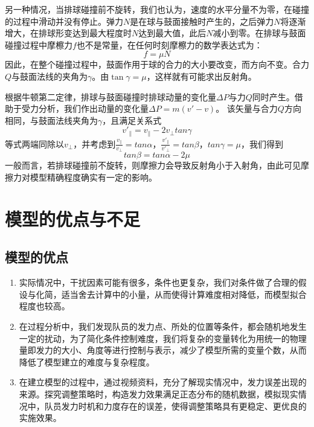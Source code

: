 \documentclass[withoutpreface,bwprint]{cumcmthesis} %
\begin{document}
另一种情况，当排球碰撞前不旋转，我们也认为，速度的水平分量不为零，在碰撞的过程中滑动并没有停止。弹力$N$是在球与鼓面接触时产生的，之后弹力$N$将逐渐增大，在排球形变达到最大程度时$N$达到最大值，此后$N$减小到零。在排球与鼓面碰撞过程中摩檫力$f$也不是常量，在任何时刻摩檫力的数学表达式为：
\begin{equation}
	f=\mu N
\end{equation}
因此，在整个碰撞过程中，鼓面作用于球的合力的大小要改变，而方向不变。合力$Q$与鼓面法线的夹角为$\gamma$。由$\tan \gamma=\mu$，这样就有可能求出反射角。

根据牛顿第二定律，排球与鼓面碰撞时排球动量的变化量$\Delta P$与力$Q$同时产生。借助于受力分析，我们作出动量的变化量$\Delta P=m(v'-v)$。
该矢量与合力$Q$方向相同，与鼓面法线夹角为$\gamma$，且满足关系式
\begin{equation}
	v'_\parallel=v_\parallel-2v_\bot tan\gamma
\end{equation}
等式两端同除以$v_\bot$，并考虑到$\frac{v_\parallel}{v_\bot}=tan\alpha$，$\frac{v'_\parallel}{v'_\bot}=tan\beta$，$tan\gamma=\mu$，我们得到
\begin{equation}
	tan\beta=tan\alpha-2\mu
\end{equation}
一般而言，若排球碰撞前不旋转，则摩擦力会导致反射角小于入射角，由此可见摩擦力对模型精确程度确实有一定的影响。
\section{模型的优点与不足}
\subsection{模型的优点}
\begin{enumerate}
\item 实际情况中，干扰因素可能有很多，条件也更复杂，我们对条件做了合理的假设与化简，适当舍去计算中的小量，从而使得计算难度相对降低，而模型拟合程度也较高。
\item 在过程分析中，我们发现队员的发力点、所处的位置等条件，都会随机地发生一定的扰动，为了简化条件控制难度，我们将复杂的变量转化为用统一的物理量即发力的大小、角度等进行控制与表示，减少了模型所需的变量个数，从而降低了模型建立的难度与复杂程度。
\item 在建立模型的过程中，通过视频资料，充分了解现实情况中，发力误差出现的来源。探究调整策略时，构造发力效果满足正态分布的随机数据，模拟现实情况中，队员发力时机和力度存在的误差，使得调整策略具有更稳定、更优良的实施效果。
\end{enumerate}
\end{document}
